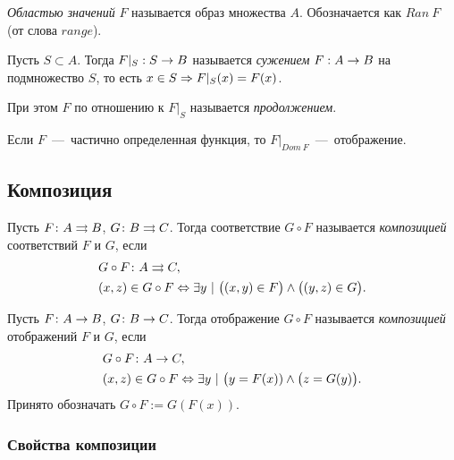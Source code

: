 \begin{definition}
	\textit{Областью значений} $F$ называется образ множества $A$. Обозначается как $Ran\ F$ (от слова $range$).
\end{definition}

\begin{definition}
	Пусть $S \subset A$. Тогда $F|_S : S \rightarrow B$ называется \textit{сужением} $F : A \rightarrow B$
	на подмножество $S$, то есть $x \in S \Rightarrow F|_S(x) = F(x)$.
	
	При этом $F$ по отношению к $F|_S$ называется \textit{продолжением}.
\end{definition}

\begin{proposition}
	Если $F$~---~частично определенная функция, то $F|_{Dom\ F}$~---~отображение.
\end{proposition}

\subsection{Композиция}

\begin{definition}
	Пусть $F \colon A \rightrightarrows B$, $G \colon B \rightrightarrows C$. Тогда соответствие $G \circ F$ называется \textit{композицией} соответствий $F$ и $G$, если
	\begin{align*}
		&G \circ F \colon A \rightrightarrows C,
		\\
		&(x, z) \in G \circ F \Leftrightarrow \exists y\ |\ \big((x, y) \in F\big) \wedge \big((y, z) \in G\big).
	\end{align*}
\end{definition}

\begin{definition}
	Пусть $F \colon A \rightarrow B$, $G \colon B \rightarrow C$. Тогда отображение $G \circ F$ называется \textit{композицией} отображений $F$ и $G$, если
	\begin{align*}
	&G \circ F \colon A \rightarrow C,
	\\
	&(x, z) \in G \circ F \Leftrightarrow \exists y\ |\ \big(y = F(x)) \wedge \big(z =  G(y)\big).
	\end{align*}
	Принято обозначать $G \circ F := G(F(x))$.
\end{definition}

\subsubsection*{Свойства композиции}

